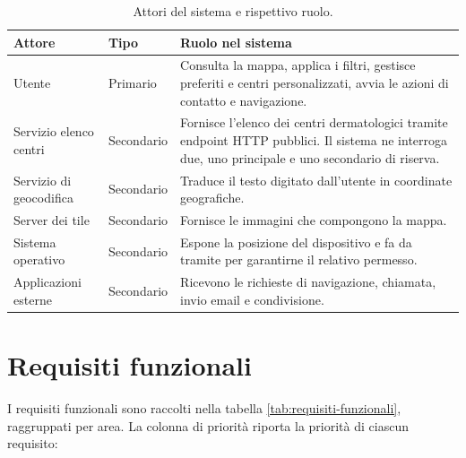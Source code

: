 \begin{table}[H]
\centering
\footnotesize
\begin{tabularx}{\textwidth}{@{}l l L@{}}
\toprule
\textbf{Attore} & \textbf{Tipo} & \textbf{Ruolo nel sistema} \tabularnewline
\midrule
Utente & Primario & Consulta la mappa, applica i filtri, gestisce preferiti e centri personalizzati, avvia le azioni di contatto
e navigazione. \tabularnewline
Servizio elenco centri & Secondario & Fornisce l'elenco dei centri dermatologici tramite endpoint HTTP pubblici.
Il sistema ne interroga due, uno principale e uno secondario di riserva. \tabularnewline
Servizio di geocodifica & Secondario & Traduce il testo digitato dall'utente in coordinate geografiche. \tabularnewline
Server dei tile & Secondario & Fornisce le immagini che compongono la mappa. \tabularnewline
Sistema operativo & Secondario & Espone la posizione del dispositivo e fa da tramite per garantirne il relativo permesso. \tabularnewline
Applicazioni esterne & Secondario & Ricevono le richieste di navigazione, chiamata, invio email e condivisione. \tabularnewline
\bottomrule
\end{tabularx}
\caption{Attori del sistema e rispettivo ruolo.}
\label{tab:attori}
\end{table}

\section{Requisiti funzionali}\label{sec:requisiti-funzionali}

I requisiti funzionali sono raccolti nella tabella \ref{tab:requisiti-funzionali}, raggruppati per area.
La colonna di priorità riporta la priorità di ciascun requisito:

